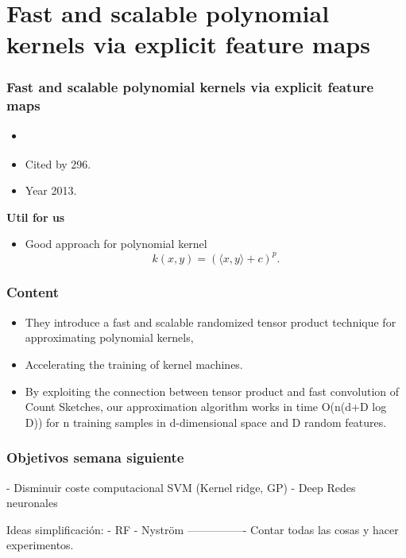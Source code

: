 \section{ Fast and scalable polynomial kernels via explicit feature maps}
\begin{frame}
    \frametitle{Fast and scalable polynomial kernels via explicit feature maps}
\begin{itemize}
    \item \cite{fast-and-scalable-polynomial-kernels}
    \item Cited by 296. 
    \item Year 2013. 
\end{itemize}

\textbf{Util for us}
\begin{itemize}
    \item Good approach for polynomial kernel 
    \begin{equation}
        k(x,y)
        = 
        (\langle x, y  \rangle + c)^p. 
    \end{equation}
\end{itemize}


\end{frame}


\begin{frame}
    \frametitle{Content}
    \begin{itemize}
        \item They introduce a fast and scalable randomized tensor product technique for approximating polynomial kernels,
        
        \item Accelerating the training of kernel machines. 
        
        \item By exploiting the connection between tensor product and fast convolution of Count Sketches, our approximation algorithm works in time O(n(d+D log D)) for n training samples in d-dimensional space and D random features.
    \end{itemize}
    

\end{frame}


\begin{frame}
    \frametitle{Objetivos semana siguiente}

    - Disminuir coste computacional SVM (Kernel ridge, GP)
    - Deep Redes neuronales 

    Ideas simplificación: 
    -  RF
    - Nyström  
----------------
Contar todas las cosas y hacer experimentos. 


\end{frame}
